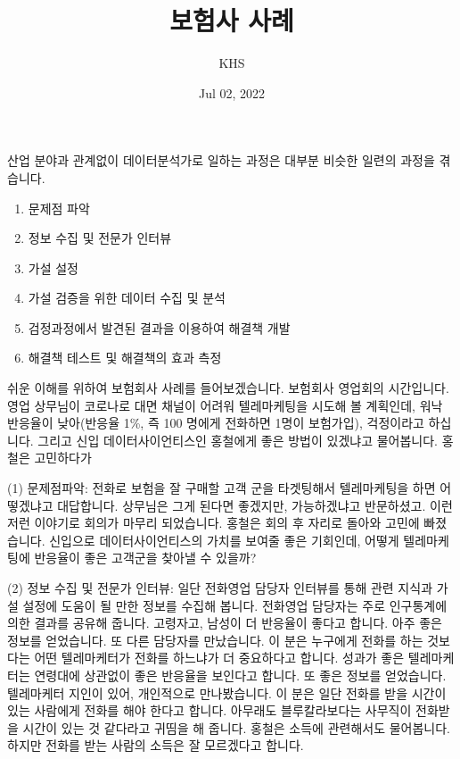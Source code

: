 \documentclass[letterpaper,10pt,english]{jupyterBook}
\title{보험사 사례}
\date{Jul 02, 2022}
\author{KHS}
\begin{document}
\pagestyle{empty}
\sphinxmaketitle
\pagestyle{plain}
\sphinxtableofcontents
\pagestyle{normal}
\label{\detokenize{chapter3/3.1.1_Use_Case::doc}}


\sphinxAtStartPar
산업 분야과 관계없이 데이터분석가로 일하는 과정은 대부분 비슷한 일련의 과정을 겪습니다.
\begin{enumerate}
%
\item {} 
\sphinxAtStartPar
문제점 파악

\item {} 
\sphinxAtStartPar
정보 수집 및 전문가 인터뷰

\item {} 
\sphinxAtStartPar
가설 설정

\item {} 
\sphinxAtStartPar
가설 검증을 위한 데이터 수집 및 분석

\item {} 
\sphinxAtStartPar
검정과정에서 발견된 결과을 이용하여 해결책 개발

\item {} 
\sphinxAtStartPar
해결책 테스트 및 해결책의 효과 측정

\end{enumerate}

\sphinxAtStartPar
쉬운 이해를 위하여 보험회사 사례를 들어보겠습니다. 보험회사 영업회의 시간입니다. 영업 상무님이 코로나로 대면 채널이 어려워 텔레마케팅을 시도해 볼 계획인데, 워낙 반응율이 낮아(반응율 1\%, 즉 100 명에게 전화하면 1명이 보험가입), 걱정이라고 하십니다. 그리고 신입 데이터사이언티스인 홍철에게 좋은 방법이 있겠냐고 물어봅니다. 홍철은 고민하다가

\sphinxAtStartPar
(1) 문제점파악: 전화로 보험을 잘 구매할 고객 군을 타겟팅해서 텔레마케팅을 하면 어떻겠냐고 대답합니다. 상무님은 그게 된다면 좋겠지만, 가능하겠냐고 반문하셨고. 이런 저런 이야기로 회의가 마무리 되었습니다. 홍철은 회의 후 자리로 돌아와 고민에 빠졌습니다. 신입으로 데이터사이언티스의 가치를 보여줄 좋은 기회인데, 어떻게 텔레마케팅에 반응율이 좋은 고객군을 찾아낼 수 있을까?

\sphinxAtStartPar
(2) 정보 수집 및 전문가 인터뷰: 일단 전화영업 담당자 인터뷰를 통해 관련 지식과 가설 설정에 도움이 될 만한 정보를 수집해 봅니다. 전화영업 담당자는 주로 인구통계에 의한 결과를 공유해 줍니다. 고령자고, 남성이 더 반응율이 좋다고 합니다. 아주 좋은 정보를 얻었습니다. 또 다른 담당자를 만났습니다. 이 분은 누구에게 전화를 하는 것보다는 어떤 텔레마케터가 전화를 하느냐가 더 중요하다고 합니다. 성과가 좋은 텔레마케터는 연령대에 상관없이 좋은 반응율을 보인다고 합니다. 또 좋은 정보를 얻었습니다. 텔레마케터 지인이 있어, 개인적으로 만나봤습니다. 이 분은 일단 전화를 받을 시간이 있는 사람에게 전화를 해야 한다고 합니다. 아무래도 블루칼라보다는 사무직이 전화받을 시간이 있는 것 같다라고 귀띰을 해 줍니다. 홍철은 소득에 관련해서도 물어봅니다. 하지만 전화를 받는 사람의 소득은 잘 모르겠다고 합니다.
\end{document}
